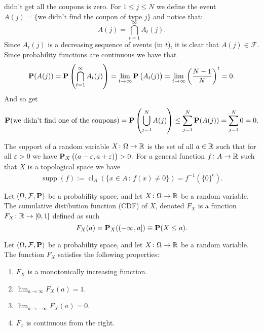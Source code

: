 \documentclass[11pt,a4paper]{article}
\begin{document}
\begin{example}
    didn't get all the coupons is zero. For $1 \le j \le N$ we define the
    event $A(j) = \{\text{we didn't find the coupon of type $j$}\}$ and notice
    that:
    \[
      A(j) = \bigcap_{t=1}^{\infty} A_t(j).
    \]
    Since $A_t(j)$ is a decreasing sequence of events (in $t$), it is clear
    that $A(j) \in \mathcal F$. Since probability functions are continuous
    we have that
    \[
      \mathbf{P}(A(j)) =
      \mathbf{P}\left(\bigcap_{t=1}^{\infty}A_{t}(j)\right) =
      \lim_{t\to\infty}\mathbf{P}\left(A_{t}(j)\right) =
      \lim_{t\to\infty}\left({\frac{N-1}{N}}\right)^{t}=0.
    \]
    And so get
    \[
      \mathbf{P}(\text{we didn't find one of the coupons}) =
      \mathbf{P}\left(\bigcup_{j=1}^{N} A(j)\right) \leq
      \sum_{j=1}^{N} \mathbf{P}(A(j)) =
      \sum_{j=1}^{N} 0 =
      0.
    \]
  \end{example}
  \begin{definition}[Support]
    The support of a random variable $X \colon \Omega \to \mathbb{R}$ is the set of all $a \in \mathbb{R}$
    such that for all $\varepsilon > 0$ we have 
    $\mathbf{P}_X\left((a - \varepsilon, a + \varepsilon)\right) > 0$.
    For a general function $f \colon A \to \mathbb{R}$ such that $X$ is a topological
    space we have
    \[
      \operatorname {supp} (f) := 
      \operatorname {cl}_{A} 
      \left(\{x\in A\,:\,f(x)\neq 0\}\right) =
      {\overline {f^{-1}\left(\{0\}^{\mathrm {c} }\right)}}.
    \]
  \end{definition}
  \begin{definition}
    Let $(\Omega, \mathcal F, \mathbf{P})$ be a probability space,
    and let $X \colon \Omega \to \mathbb{R}$ be a random variable.
    The cumulative distibution function (CDF) of $X$, denoted $F_X$ is
    a function $F_X \colon \mathbb{R} \to [0,1]$ defined as such
    \[
      F_{X}(a) = \mathbf{P}_{X}((-\infty,a]) \equiv \mathbf{P}(X \leq a).
    \]
    \end{definition}
  \begin{proposition}
    Let $(\Omega, \mathcal F, \mathbf{P})$ be a probability space,
    and let $X \colon \Omega \to \mathbb{R}$ be a random variable.
    The function $F_X$ satisfies the following properties:
    \begin{enumerate}
      \item $F_X$ is a monotonically increasing function.
      \item $\lim_{a \to \infty} F_X(a) = 1$.
      \item $\lim_{a \to -\infty} F_X(a) = 0$.
      \item $F_x$ is continuous from the right.
    \end{enumerate}
  \end{proposition}
\end{document}
